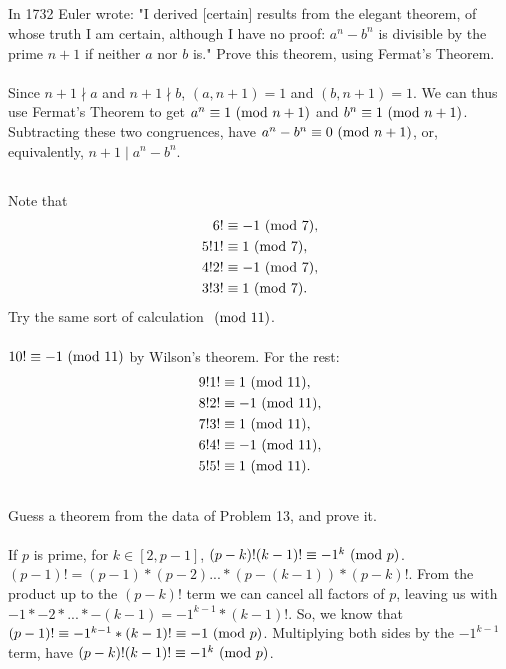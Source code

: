 \documentclass{article}
\begin{document}
\subsection{}
In 1732 Euler wrote: "I derived [certain] results from the elegant theorem, of whose
truth I am certain, although I have no proof: $a^n - b^n$ is divisible by the prime
$n + 1$ if neither $a$ nor $b$ is." Prove this theorem, using Fermat's Theorem.\\~\\
Since $n + 1 \nmid a$ and $n + 1 \nmid b$, $(a, n + 1) = 1$ and $(b, n + 1) = 1$.
We can thus use Fermat's Theorem to get
$a^n \equiv 1 \ (\mathrm{mod}\ n+1)$ and $b^n \equiv 1 \ (\mathrm{mod}\ n+1)$.
Subtracting these two congruences, have $a^n - b^n \equiv 0 \ (\mathrm{mod}\ n+1)$,
or, equivalently, $n + 1 \mid a^n - b^n$.

\subsection{}
Note that
\begin{align*}
    6! &\equiv -1 \ (\mathrm{mod}\ 7),\\
    5!1! &\equiv 1 \ (\mathrm{mod}\ 7),\\
    4!2! &\equiv -1 \ (\mathrm{mod}\ 7),\\
    3!3! &\equiv 1 \ (\mathrm{mod}\ 7).
\end{align*}
Try the same sort of calculation $\ (\mathrm{mod}\ 11)$.\\~\\
$10! \equiv -1 \ (\mathrm{mod}\ 11)$ by Wilson's theorem. For the rest:
\begin{align*}
    9!1! &\equiv 1 \ (\mathrm{mod}\ 11),\\
    8!2! &\equiv -1 \ (\mathrm{mod}\ 11),\\
    7!3! &\equiv 1 \ (\mathrm{mod}\ 11),\\
    6!4! &\equiv -1 \ (\mathrm{mod}\ 11),\\
    5!5! &\equiv 1 \ (\mathrm{mod}\ 11).\\
\end{align*}

\subsection{}
Guess a theorem from the data of Problem 13, and prove it.\\~\\
If $p$ is prime, for $k \in [2, p - 1]$, $(p - k)!(k - 1)! \equiv -1^k \ (\mathrm{mod}\ p)$.\\
$(p - 1)! = (p - 1) * (p - 2) ... * (p - (k - 1)) * (p - k)!$.
From the product up to the $(p - k)!$ term we can cancel all factors of $p$,
leaving us with $-1 * -2 * ... * -(k - 1) = -1^{k - 1} * (k - 1)!$.
So, we know that $(p - 1)! \equiv -1^{k - 1} * (k - 1)! \equiv -1 \ (\mathrm{mod}\ p)$.
Multiplying both sides by the $-1^{k - 1}$ term, have
 $(p - k)!(k - 1)! \equiv -1^k \ (\mathrm{mod}\ p)$.
\end{document}
